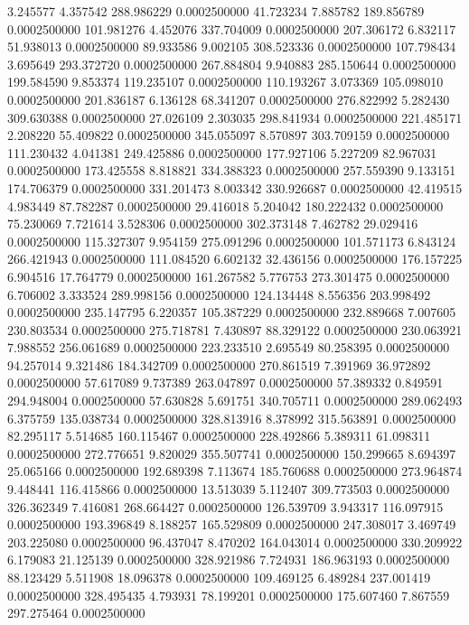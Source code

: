 3.245577 4.357542 288.986229 0.0002500000
41.723234 7.885782 189.856789 0.0002500000
101.981276 4.452076 337.704009 0.0002500000
207.306172 6.832117 51.938013 0.0002500000
89.933586 9.002105 308.523336 0.0002500000
107.798434 3.695649 293.372720 0.0002500000
267.884804 9.940883 285.150644 0.0002500000
199.584590 9.853374 119.235107 0.0002500000
110.193267 3.073369 105.098010 0.0002500000
201.836187 6.136128 68.341207 0.0002500000
276.822992 5.282430 309.630388 0.0002500000
27.026109 2.303035 298.841934 0.0002500000
221.485171 2.208220 55.409822 0.0002500000
345.055097 8.570897 303.709159 0.0002500000
111.230432 4.041381 249.425886 0.0002500000
177.927106 5.227209 82.967031 0.0002500000
173.425558 8.818821 334.388323 0.0002500000
257.559390 9.133151 174.706379 0.0002500000
331.201473 8.003342 330.926687 0.0002500000
42.419515 4.983449 87.782287 0.0002500000
29.416018 5.204042 180.222432 0.0002500000
75.230069 7.721614 3.528306 0.0002500000
302.373148 7.462782 29.029416 0.0002500000
115.327307 9.954159 275.091296 0.0002500000
101.571173 6.843124 266.421943 0.0002500000
111.084520 6.602132 32.436156 0.0002500000
176.157225 6.904516 17.764779 0.0002500000
161.267582 5.776753 273.301475 0.0002500000
6.706002 3.333524 289.998156 0.0002500000
124.134448 8.556356 203.998492 0.0002500000
235.147795 6.220357 105.387229 0.0002500000
232.889668 7.007605 230.803534 0.0002500000
275.718781 7.430897 88.329122 0.0002500000
230.063921 7.988552 256.061689 0.0002500000
223.233510 2.695549 80.258395 0.0002500000
94.257014 9.321486 184.342709 0.0002500000
270.861519 7.391969 36.972892 0.0002500000
57.617089 9.737389 263.047897 0.0002500000
57.389332 0.849591 294.948004 0.0002500000
57.630828 5.691751 340.705711 0.0002500000
289.062493 6.375759 135.038734 0.0002500000
328.813916 8.378992 315.563891 0.0002500000
82.295117 5.514685 160.115467 0.0002500000
228.492866 5.389311 61.098311 0.0002500000
272.776651 9.820029 355.507741 0.0002500000
150.299665 8.694397 25.065166 0.0002500000
192.689398 7.113674 185.760688 0.0002500000
273.964874 9.448441 116.415866 0.0002500000
13.513039 5.112407 309.773503 0.0002500000
326.362349 7.416081 268.664427 0.0002500000
126.539709 3.943317 116.097915 0.0002500000
193.396849 8.188257 165.529809 0.0002500000
247.308017 3.469749 203.225080 0.0002500000
96.437047 8.470202 164.043014 0.0002500000
330.209922 6.179083 21.125139 0.0002500000
328.921986 7.724931 186.963193 0.0002500000
88.123429 5.511908 18.096378 0.0002500000
109.469125 6.489284 237.001419 0.0002500000
328.495435 4.793931 78.199201 0.0002500000
175.607460 7.867559 297.275464 0.0002500000
